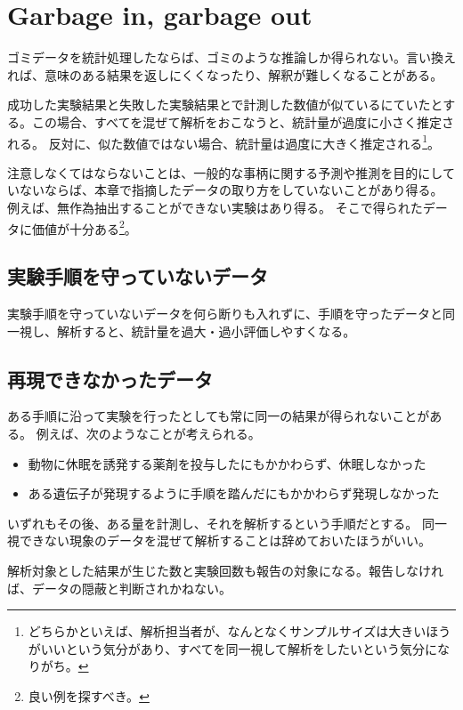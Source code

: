 \section{Garbage in, garbage out}
ゴミデータを統計処理したならば、ゴミのような推論しか得られない。言い換えれば、意味のある結果を返しにくくなったり、解釈が難しくなることがある。


成功した実験結果と失敗した実験結果とで計測した数値が似ているにていたとする。この場合、すべてを混ぜて解析をおこなうと、統計量が過度に小さく推定される。
反対に、似た数値ではない場合、統計量は過度に大きく推定される\footnote{どちらかといえば、解析担当者が、なんとなくサンプルサイズは大きいほうがいいという気分があり、すべてを同一視して解析をしたいという気分になりがち。}。

注意しなくてはならないことは、一般的な事柄に関する予測や推測を目的にしていないならば、本章で指摘したデータの取り方をしていないことがあり得る。
例えば、無作為抽出することができない実験はあり得る。
そこで得られたデータに価値が十分ある\footnote{良い例を探すべき。}。%
\fi

\subsection{実験手順を守っていないデータ}
実験手順を守っていないデータを何ら断りも入れずに、手順を守ったデータと同一視し、解析すると、統計量を過大・過小評価しやすくなる。

\subsection{再現できなかったデータ}
ある手順に沿って実験を行ったとしても常に同一の結果が得られないことがある。
例えば、次のようなことが考えられる。
\begin{itemize}
    \item 動物に休眠を誘発する薬剤を投与したにもかかわらず、休眠しなかった
    \item ある遺伝子が発現するように手順を踏んだにもかかわらず発現しなかった
\end{itemize}
いずれもその後、ある量を計測し、それを解析するという手順だとする。
同一視できない現象のデータを混ぜて解析することは辞めておいたほうがいい。

解析対象とした結果が生じた数と実験回数も報告の対象になる。報告しなければ、データの隠蔽と判断されかねない。


